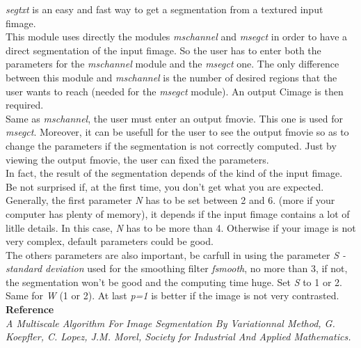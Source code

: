 {\it segtxt} is an easy and fast 
way to get a segmentation from a textured input fimage.\\
This module uses directly the modules {\it mschannel} and {\it msegct} in order to have a direct segmentation 
of the input fimage. So the user has to enter both the parameters for the {\it mschannel}
 module and the {\it msegct} one. The only difference between 
 this module and {\it mschannel} is the number of desired regions that the user wants to reach (needed for the {\it msegct} 
 module). An output Cimage is then required.\\
 Same as {\it mschannel}, the user must enter an output fmovie. This one is used for {\it msegct}.
 Moreover, it can be usefull for the user to see the output fmovie so as to change the parameters
  if the segmentation is not correctly computed. Just by viewing the output fmovie, the user can fixed the parameters.\\
  In fact, the result of the segmentation depends of the kind of the input fimage. 
 Be not surprised if, at the first time, you don't get what you are expected. 
 Generally, the first parameter {\it N} has to be set between 2 and 6. (more if your computer has plenty of memory), it depends if the  input fimage contains a lot of litlle details. 
 In this case, {\it N} has to be more than 4. Otherwise if your image is not very complex, default parameters could be good.\\
 The others parameters are also important, be carfull in using the parameter {\it S - standard deviation} used for the smoothing filter {\it fsmooth}, 
 no more than 3, if not, the segmentation won't be good and the computing time huge. Set 
 {\it S} to 1 or 2. Same for {\it W} (1 or 2). At last {\it p=1} is better if the image is not
 very contrasted.\\
 
 {\Large \bf Reference}\\  
 
 {\it A Multiscale Algorithm For Image Segmentation By Variationnal Method, G. Koepfler, C. Lopez, J.M. Morel, Society for Industrial And Applied Mathematics.} 
 
